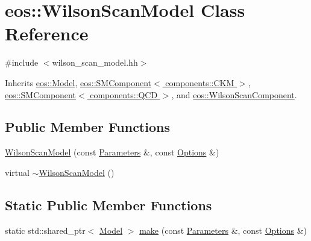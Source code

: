 \hypertarget{classeos_1_1WilsonScanModel}{
\section{eos::WilsonScanModel Class Reference}
\label{classeos_1_1WilsonScanModel}
}


{\ttfamily \#include $<$wilson\_\-scan\_\-model.hh$>$}

Inherits \hyperlink{classeos_1_1Model}{eos::Model}, \hyperlink{classeos_1_1SMComponent_3_01components_1_1CKM_01_4}{eos::SMComponent$<$ components::CKM $>$}, \hyperlink{classeos_1_1SMComponent_3_01components_1_1QCD_01_4}{eos::SMComponent$<$ components::QCD $>$}, and \hyperlink{classeos_1_1WilsonScanComponent}{eos::WilsonScanComponent}.\subsection*{Public Member Functions}
\begin{DoxyCompactItemize}
\item 
\hyperlink{classeos_1_1WilsonScanModel_a2fe7c661cc571ee01d4b3fecc226faa3}{WilsonScanModel} (const \hyperlink{classeos_1_1Parameters}{Parameters} \&, const \hyperlink{classeos_1_1Options}{Options} \&)
\item 
virtual \hyperlink{classeos_1_1WilsonScanModel_a58838548fa93543a0c2738e5b8ff4509}{$\sim$WilsonScanModel} ()
\end{DoxyCompactItemize}
\subsection*{Static Public Member Functions}
\begin{DoxyCompactItemize}
\item 
static std::shared\_\-ptr$<$ \hyperlink{classeos_1_1Model}{Model} $>$ \hyperlink{classeos_1_1WilsonScanModel_a34b4ce1af19a406f354b4bbaf461df40}{make} (const \hyperlink{classeos_1_1Parameters}{Parameters} \&, const \hyperlink{classeos_1_1Options}{Options} \&)
\end{DoxyCompactItemize}


